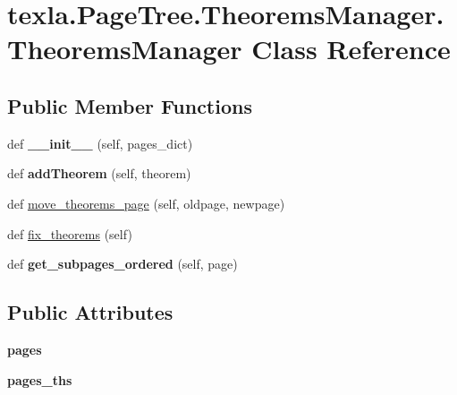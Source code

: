 \hypertarget{classtexla_1_1PageTree_1_1TheoremsManager_1_1TheoremsManager}{}\section{texla.\+Page\+Tree.\+Theorems\+Manager.\+Theorems\+Manager Class Reference}
\label{classtexla_1_1PageTree_1_1TheoremsManager_1_1TheoremsManager}
\subsection*{Public Member Functions}
\begin{DoxyCompactItemize}
\item 
\hypertarget{classtexla_1_1PageTree_1_1TheoremsManager_1_1TheoremsManager_a838c2b4785f4a9e1ba3c7dbc67135f11}{}\label{classtexla_1_1PageTree_1_1TheoremsManager_1_1TheoremsManager_a838c2b4785f4a9e1ba3c7dbc67135f11} 
def {\bfseries \+\_\+\+\_\+init\+\_\+\+\_\+} (self, pages\+\_\+dict)
\item 
\hypertarget{classtexla_1_1PageTree_1_1TheoremsManager_1_1TheoremsManager_a6c07b258a97c0e2f9fd959b63bac0151}{}\label{classtexla_1_1PageTree_1_1TheoremsManager_1_1TheoremsManager_a6c07b258a97c0e2f9fd959b63bac0151} 
def {\bfseries add\+Theorem} (self, theorem)
\item 
def \hyperlink{classtexla_1_1PageTree_1_1TheoremsManager_1_1TheoremsManager_a31188ef920568ca338e846b292c1e0b1}{move\+\_\+theorems\+\_\+page} (self, oldpage, newpage)
\item 
def \hyperlink{classtexla_1_1PageTree_1_1TheoremsManager_1_1TheoremsManager_a399fc28cf03a96352c6136a850cd46b9}{fix\+\_\+theorems} (self)
\item 
\hypertarget{classtexla_1_1PageTree_1_1TheoremsManager_1_1TheoremsManager_a5921ce72c90d386d07dc04ebdda83a5b}{}\label{classtexla_1_1PageTree_1_1TheoremsManager_1_1TheoremsManager_a5921ce72c90d386d07dc04ebdda83a5b} 
def {\bfseries get\+\_\+subpages\+\_\+ordered} (self, page)
\end{DoxyCompactItemize}
\subsection*{Public Attributes}
\begin{DoxyCompactItemize}
\item 
\hypertarget{classtexla_1_1PageTree_1_1TheoremsManager_1_1TheoremsManager_afb35ab75facdff4f0e5d92e110a38fe9}{}\label{classtexla_1_1PageTree_1_1TheoremsManager_1_1TheoremsManager_afb35ab75facdff4f0e5d92e110a38fe9} 
{\bfseries pages}
\item 
\hypertarget{classtexla_1_1PageTree_1_1TheoremsManager_1_1TheoremsManager_a46e115caef1a718e23db1d766c249856}{}\label{classtexla_1_1PageTree_1_1TheoremsManager_1_1TheoremsManager_a46e115caef1a718e23db1d766c249856} 
{\bfseries pages\+\_\+ths}
\end{DoxyCompactItemize}


